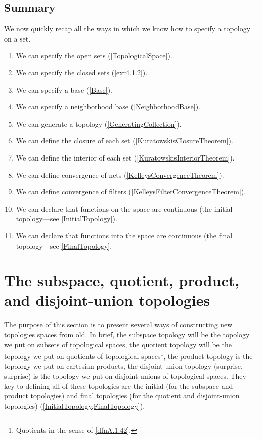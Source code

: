 \subsection{Summary}

We now quickly recap all the ways in which we know how to specify a topology on a set.
\begin{enumerate}
\item We can specify the open sets (\cref{TopologicalSpace})..
\item We can specify the closed sets (\cref{exr4.1.2}).
\item We can specify a base (\cref{Base}).
\item We can specify a neighborhood base (\cref{NeighborhoodBase}).
\item We can generate a topology (\cref{GeneratingCollection}).
\item We can define the closure of each set (\cref{KuratowskisClosureTheorem}).
\item We can define the interior of each set (\cref{KuratowskisInteriorTheorem}).
\item We can define convergence of nets (\cref{KelleysConvergenceTheorem}).
\item We can define convergence of filters (\cref{KelleysFilterConvergenceTheorem}).
\item We can declare that functions on the space are continuous (the initial topology---see \cref{InitialTopology}).
\item We can declare that functions into the space are continuous (the final topology---see \cref{FinalTopology}.
\end{enumerate}

\section{The subspace, quotient, product, and disjoint-union topologies}

The purpose of this section is to present several ways of constructing new topologies spaces from old.  In brief, the subspace topology will be the topology we put on subsets of topological spaces, the quotient topology will be the topology we put on quotients of topological spaces\footnote{Quotients in the sense of \cref{dfnA.1.42}.}, the product topology is the topology we put on cartesian-products, the disjoint-union topology (surprise, surprise) is the topology we put on disjoint-unions of topological spaces.  They key to defining all of these topologies are the initial (for the subspace and product topologies) and final topologies (for the quotient and disjoint-union topologies) (\cref{InitialTopology,FinalTopology}).

